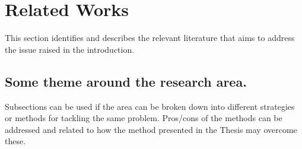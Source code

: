 \section{Related Works}
\label{sec:3-literature}

This section identifies and describes the relevant literature that aims to address the issue raised in the introduction.

\subsection{Some theme around the research area.}

Subsections can be used if the area can be broken down into different strategies or methods for tackling the same problem. Pros/cons of the methods can be addressed and related to how the method presented in the Thesis may overcome these.
